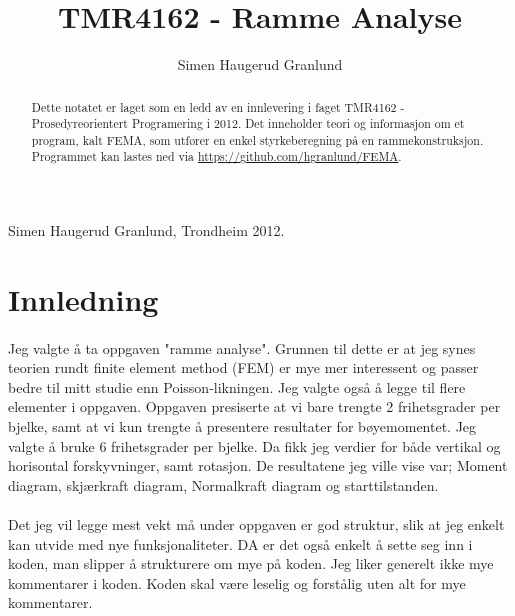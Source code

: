 \documentclass[10pt,a4paper, norsk]{article}
\author{Simen Haugerud Granlund}
\title{TMR4162 - Ramme Analyse}
\begin{document}
\maketitle

\thispagestyle{empty} 	%
\newpage %

\begin{abstract}
Dette notatet er laget som en ledd av en innlevering i faget TMR4162 - Prosedyreorientert Programering i 2012. Det inneholder teori og informasjon om et program, kalt FEMA, som utfører en enkel styrkeberegning på en rammekonstruksjon. Programmet kan lastes ned via \url{https://github.com/hgranlund/FEMA}.
\end{abstract}

\begin{flushright}
Simen Haugerud Granlund, Trondheim 2012.
\end{flushright}
\newpage


\tableofcontents
\newpage


\section{Innledning}
\paragraph{}
Jeg valgte å ta oppgaven "ramme analyse". Grunnen til dette er at jeg synes teorien rundt finite element method (FEM) er mye mer interessent og passer bedre til mitt studie enn Poisson-likningen. Jeg valgte også å legge til flere elementer i oppgaven. Oppgaven presiserte at vi bare trengte 2 frihetsgrader per bjelke, samt at vi kun trengte å presentere resultater for bøyemomentet. Jeg valgte å bruke 6 frihetsgrader per bjelke. Da fikk jeg verdier for både vertikal og horisontal forskyvninger, samt rotasjon. De resultatene jeg ville vise var; Moment diagram, skjærkraft diagram, Normalkraft diagram og starttilstanden. 

\paragraph{}
Det jeg vil legge mest vekt må under oppgaven er god struktur, slik at jeg enkelt kan utvide med nye funksjonaliteter. DA er det også enkelt å sette seg inn i koden, man slipper å strukturere  om mye på koden. Jeg liker generelt ikke mye kommentarer i koden. Koden skal være leselig og forstålig uten alt for mye kommentarer.
\end{document}
